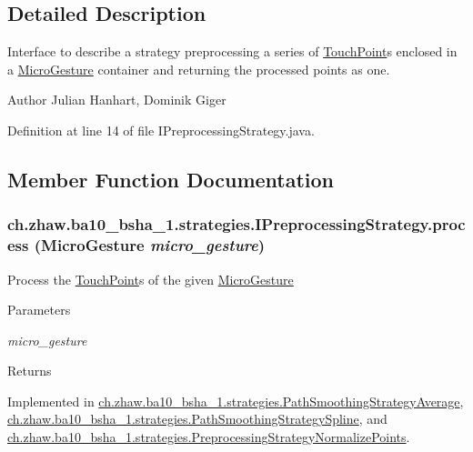 \subsection{Detailed Description}
Interface to describe a strategy preprocessing a series of \hyperlink{classch_1_1zhaw_1_1ba10__bsha__1_1_1TouchPoint}{TouchPoint}s enclosed in a \hyperlink{}{MicroGesture} container and returning the processed points as one.

\begin{DoxyAuthor}{Author}
Julian Hanhart, Dominik Giger 
\end{DoxyAuthor}


Definition at line 14 of file IPreprocessingStrategy.java.

\subsection{Member Function Documentation}
\hypertarget{interfacech_1_1zhaw_1_1ba10__bsha__1_1_1strategies_1_1IPreprocessingStrategy_a3e3885dce8fda7b79dc514078f11ad62}{
\subsubsection[{process}]{ ch.zhaw.ba10\_\-bsha\_\-1.strategies.IPreprocessingStrategy.process ({\bf MicroGesture} {\em micro\_\-gesture})}}
\label{interfacech_1_1zhaw_1_1ba10__bsha__1_1_1strategies_1_1IPreprocessingStrategy_a3e3885dce8fda7b79dc514078f11ad62}
Process the \hyperlink{classch_1_1zhaw_1_1ba10__bsha__1_1_1TouchPoint}{TouchPoint}s of the given \hyperlink{}{MicroGesture}


\begin{DoxyParams}{Parameters}
\item[{\em micro\_\-gesture}]\end{DoxyParams}
\begin{DoxyReturn}{Returns}

\end{DoxyReturn}


Implemented in \hyperlink{classch_1_1zhaw_1_1ba10__bsha__1_1_1strategies_1_1PathSmoothingStrategyAverage_a1f021ea53245e6ebfa044ca3bb8b0210}{ch.zhaw.ba10\_\-bsha\_\-1.strategies.PathSmoothingStrategyAverage}, \hyperlink{classch_1_1zhaw_1_1ba10__bsha__1_1_1strategies_1_1PathSmoothingStrategySpline_ad3e6346b66b88e50ce7c985ff3d99644}{ch.zhaw.ba10\_\-bsha\_\-1.strategies.PathSmoothingStrategySpline}, and \hyperlink{classch_1_1zhaw_1_1ba10__bsha__1_1_1strategies_1_1PreprocessingStrategyNormalizePoints_a0b7ffa8b9a2f6d98a2b871fc4afa39f9}{ch.zhaw.ba10\_\-bsha\_\-1.strategies.PreprocessingStrategyNormalizePoints}.

